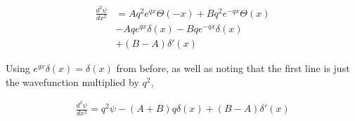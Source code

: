 \documentclass[11pt]{amsart}
\begin{document}
\begin{align*}
  \frac{d^2\psi}{dx^2} &= Aq^2e^{qx}\Theta(-x) + Bq^2e^{-qx}\Theta(x) \\
                       &- Aqe^{qx}\delta(x) - Bqe^{-qx}\delta(x) \\
                       &+ (B-A)\delta'(x)
\end{align*}

Using $e^{qx}\delta(x) = \delta(x)$ from before, as well as noting that the first line is just the wavefunction multiplied by $q^2$,

\begin{align*}
  \frac{d^2\psi}{dx^2} = q^2\psi - (A+B)q\delta(x) + (B-A)\delta'(x)
\end{align*}
\end{document}

